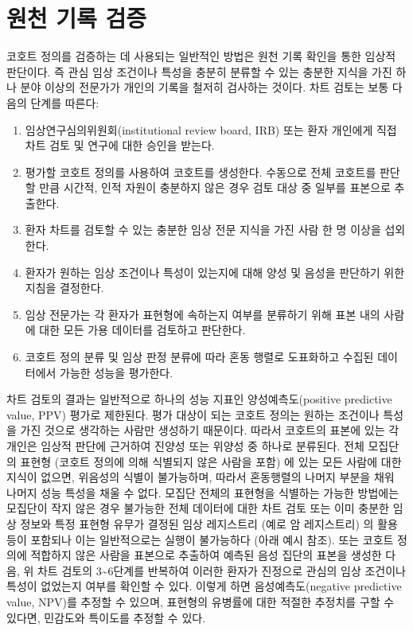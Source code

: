 \documentclass[11pt]{book}
\providecommand{\tightlist}{%
  \setlength{\itemsep}{0pt}\setlength{\parskip}{0pt}}
\theoremstyle{definition}
\theoremstyle{definition}
\theoremstyle{definition}
\theoremstyle{remark}
\begin{document}
\section{원천 기록 검증}\label{--}


코호트 정의를 검증하는 데 사용되는 일반적인 방법은 원천 기록 확인을 통한
임상적 판단이다. 즉 관심 임상 조건이나 특성을 충분히 분류할 수 있는
충분한 지식을 가진 하나 분야 이상의 전문가가 개인의 기록을 철저히
검사하는 것이다. 차트 검토는 보통 다음의 단계를 따른다:

\begin{enumerate}
\def\labelenumi{\arabic{enumi}.}
\tightlist
\item
  임상연구심의위원회(institutional review board, IRB) 또는 환자 개인에게
  직접 차트 검토 및 연구에 대한 승인을 받는다.
\item
  평가할 코호트 정의를 사용하여 코호트를 생성한다. 수동으로 전체
  코호트를 판단할 만큼 시간적, 인적 자원이 충분하지 않은 경우 검토 대상
  중 일부를 표본으로 추출한다.
\item
  환자 차트를 검토할 수 있는 충분한 임상 전문 지식을 가진 사람 한 명
  이상을 섭외한다.
\item
  환자가 원하는 임상 조건이나 특성이 있는지에 대해 양성 및 음성을
  판단하기 위한 지침을 결정한다.
\item
  임상 전문가는 각 환자가 표현형에 속하는지 여부를 분류하기 위해 표본
  내의 사람에 대한 모든 가용 데이터를 검토하고 판단한다.
\item
  코호트 정의 분류 및 임상 판정 분류에 따라 혼동 행렬로 도표화하고
  수집된 데이터에서 가능한 성능을 평가한다.
\end{enumerate}

차트 검토의 결과는 일반적으로 하나의 성능 지표인 양성예측도(positive
predictive value, PPV) 평가로 제한된다. 평가 대상이 되는 코호트 정의는
원하는 조건이나 특성을 가진 것으로 생각하는 사람만 생성하기 때문이다.
따라서 코호트의 표본에 있는 각 개인은 임상적 판단에 근거하여 진양성 또는
위양성 중 하나로 분류된다. 전체 모집단의 표현형 (코호트 정의에 의해
식별되지 않은 사람을 포함) 에 있는 모든 사람에 대한 지식이 없으면,
위음성의 식별이 불가능하며, 따라서 혼동행렬의 나머지 부분을 채워 나머지
성능 특성을 채울 수 없다. 모집단 전체의 표현형을 식별하는 가능한
방법에는 모집단이 작지 않은 경우 불가능한 전체 데이터에 대한 차트 검토
또는 이미 충분한 임상 정보와 특정 표현형 유무가 결정된 임상 레지스트리
(예로 암 레지스트리) 의 활용 등이 포함되나 이는 일반적으로는 실행이
불가능하다 (아래 예시 참조). 또는 코호트 정의에 적합하지 않은 사람을
표본으로 추출하여 예측된 음성 집단의 표본을 생성한 다음, 위 차트 검토의
3\textasciitilde{}6단계를 반복하여 이러한 환자가 진정으로 관심의 임상
조건이나 특성이 없었는지 여부를 확인할 수 있다. 이렇게 하면
음성예측도(negative predictive value, NPV)를 추정할 수 있으며, 표현형의
유병률에 대한 적절한 추정치를 구할 수 있다면, 민감도와 특이도를 추정할
수 있다.
\end{document}
